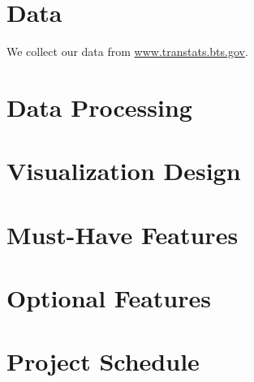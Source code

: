\documentclass[12pt]{article}
\begin{document}
\section{Data}
    We collect our data from \url{www.transtats.bts.gov}.
\section{Data Processing}
\section{Visualization Design}
\section{Must-Have Features}
\section{Optional Features}
\section{Project Schedule}
\end{document}
